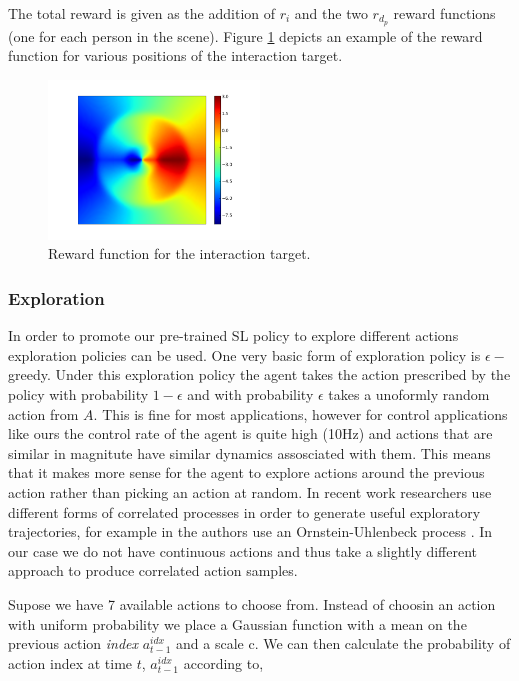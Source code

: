 \documentclass[a4paper,11pt]{report}
\begin{document}
The total reward is given as the addition of $r_i$ and the two $r_{d_p}$ reward functions (one for each person in the scene). Figure \ref{fig:int_reward} depicts an example of the reward function for various positions of the interaction target.
 
 	\begin{figure}
	\centering
	    \includegraphics[width=0.5\textwidth]{figures/int_reward.png}
	  \caption[Interaction target reward]{Reward function for the interaction target.}
	  \label{fig:int_reward}
	\end{figure}

\subsubsection{Exploration}
In order to promote our pre-trained SL policy to explore different actions exploration policies can be used. One very basic form of exploration policy is $\epsilon-$greedy. Under this exploration policy the agent takes the action prescribed by the policy with probability $1-\epsilon$ and with probability $\epsilon$ takes a unoformly random action from $A$. This is fine for most applications, however for control applications like ours the control rate of the agent is quite high (10Hz) and actions that are similar in magnitute have similar dynamics assosciated with them. This means that it makes more sense for the agent to explore actions around the previous action rather than picking an action at random. In recent work researchers use different forms of correlated processes in order to generate useful exploratory trajectories, for example in \cite{lillicrap2015continuous} the authors use an  Ornstein-Uhlenbeck process \cite{uhlenbeck1930theory}. In our case we do not have continuous actions and thus take a slightly different approach to produce correlated action samples. 

Supose we have 7 available actions to choose from. Instead of choosin an action with uniform probability we place a Gaussian function with a mean on the previous action \emph{index} $a^{idx}_{t-1}$ and a scale c. We can then calculate the probability of action index at time $t$, $a^{idx}_{t-1}$ according to,   
\end{document}
